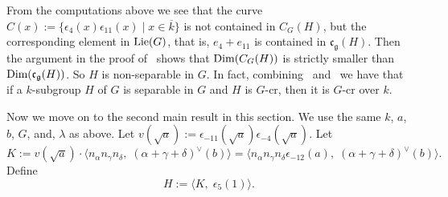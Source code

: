 \begin{rem}\label{D4nonsep}
From the computations above we see that the curve $C(x):=\{\epsilon_{4}(x)\epsilon_{11}(x)\mid x\in \overline k\}$ is not contained in $C_G(H)$, but the corresponding element in $\textup{Lie}(G)$, that is, $e_4+e_{11}$ is contained in $\mathfrak{c}_{\mathfrak{g}}(H)$. Then the argument in the proof of~\cite[Prop.~3.3]{Uchiyama-Separability-JAlgebra} shows that $\textup{Dim}(C_G(H))$ is strictly smaller than $\textup{Dim}(\mathfrak{c}_{\mathfrak{g}}(H))$. So $H$ is non-separable in $G$. 
In fact, combining~\cite[Thm.~1.5]{Bate-cocharacter-Arx} and~\cite[Thm.~9.3]{Bate-cocharacter-Arx} we have that if a $k$-subgroup $H$ of $G$ is separable in $G$ and $H$ is $G$-cr, then it is $G$-cr over $k$. 
\end{rem}

\vspace{5mm}
Now we move on to the second main result in this section. We use the same $k$, $a$, $b$, $G$, and, $\lambda$ as above. Let $v(\sqrt a):=\epsilon_{-11}(\sqrt a)\epsilon_{-4}(\sqrt a)$. Let
\begin{equation*}
K:=v(\sqrt a)\cdot \langle n_{\alpha} n_{\gamma} n_{\delta},\; (\alpha+\gamma+\delta)^{\vee}(b)\rangle=\langle n_\alpha n_\gamma n_\delta \epsilon_{-12}(a), \;  (\alpha+\gamma+\delta)^{\vee}(b)\rangle. 
\end{equation*}
Define
\begin{equation*}
H:=\langle K, \; \epsilon_{5}(1) \rangle.
\end{equation*}

